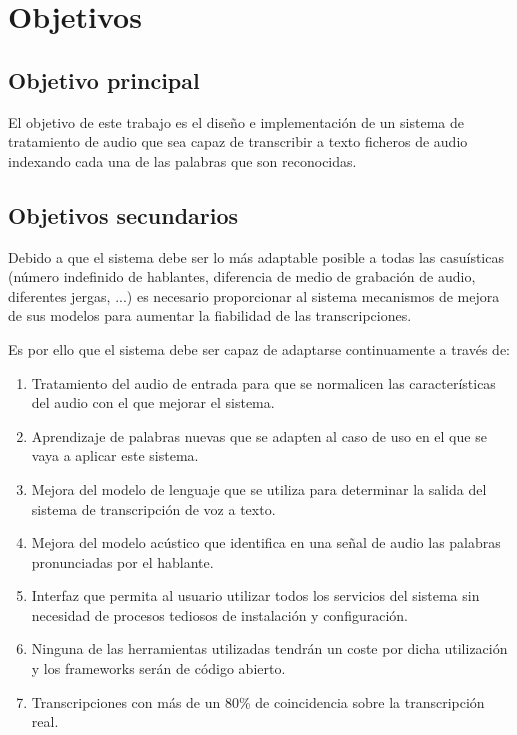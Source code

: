 \documentclass[../main.tex]{subfiles}
\begin{document}
\chapter{Objetivos}\label{ch:objetivos}
\section{Objetivo principal}\label{sec:obj_principal}
El objetivo de este trabajo es el diseño e implementación de un sistema de tratamiento de audio que sea capaz de transcribir a texto ficheros de audio indexando cada una de las palabras que son reconocidas.

\section{Objetivos secundarios}\label{sec:obj_secundarios}
Debido a que el sistema debe ser lo más adaptable posible a todas las casuísticas (número indefinido de hablantes, diferencia de medio de grabación de audio, diferentes jergas, ...) es necesario proporcionar al sistema mecanismos de mejora de sus modelos para aumentar la fiabilidad de las transcripciones.

Es por ello que el sistema debe ser capaz de adaptarse continuamente a través de:
\begin{enumerate}
    \item Tratamiento del audio de entrada para que se normalicen las características del audio con el que mejorar el sistema.
    \item Aprendizaje de palabras nuevas que se adapten al caso de uso en el que se vaya a aplicar este sistema.
    \item Mejora del modelo de lenguaje que se utiliza para determinar la salida del sistema de transcripción de voz a texto.
    \item Mejora del modelo acústico que identifica en una señal de audio las palabras pronunciadas por el hablante.
    \item Interfaz que permita al usuario utilizar todos los servicios del sistema sin necesidad de procesos tediosos de instalación y configuración.
    \item Ninguna de las herramientas utilizadas tendrán un coste por dicha utilización y los \gls{frameworks} serán de código abierto.
    \item Transcripciones con más de un 80\% de coincidencia sobre la transcripción real.
\end{enumerate}
\end{document}
